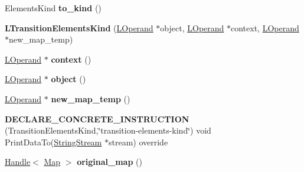 \begin{DoxyCompactItemize}
\item 
Elements\+Kind {\bfseries to\+\_\+kind} ()\hypertarget{classv8_1_1internal_1_1_l_transition_elements_kind_a131f478caf0a117639ee35cd0bdeed59}{}\label{classv8_1_1internal_1_1_l_transition_elements_kind_a131f478caf0a117639ee35cd0bdeed59}

\item 
{\bfseries L\+Transition\+Elements\+Kind} (\hyperlink{classv8_1_1internal_1_1_l_operand}{L\+Operand} $\ast$object, \hyperlink{classv8_1_1internal_1_1_l_operand}{L\+Operand} $\ast$context, \hyperlink{classv8_1_1internal_1_1_l_operand}{L\+Operand} $\ast$new\+\_\+map\+\_\+temp)\hypertarget{classv8_1_1internal_1_1_l_transition_elements_kind_a6a44fc06b9c2f761c817997ec00269f3}{}\label{classv8_1_1internal_1_1_l_transition_elements_kind_a6a44fc06b9c2f761c817997ec00269f3}

\item 
\hyperlink{classv8_1_1internal_1_1_l_operand}{L\+Operand} $\ast$ {\bfseries context} ()\hypertarget{classv8_1_1internal_1_1_l_transition_elements_kind_aad280c0f1cf8e5ca120cf21b05bd93f0}{}\label{classv8_1_1internal_1_1_l_transition_elements_kind_aad280c0f1cf8e5ca120cf21b05bd93f0}

\item 
\hyperlink{classv8_1_1internal_1_1_l_operand}{L\+Operand} $\ast$ {\bfseries object} ()\hypertarget{classv8_1_1internal_1_1_l_transition_elements_kind_a0257a511e1579fbc39001caf5b0ca855}{}\label{classv8_1_1internal_1_1_l_transition_elements_kind_a0257a511e1579fbc39001caf5b0ca855}

\item 
\hyperlink{classv8_1_1internal_1_1_l_operand}{L\+Operand} $\ast$ {\bfseries new\+\_\+map\+\_\+temp} ()\hypertarget{classv8_1_1internal_1_1_l_transition_elements_kind_a4a446ffbd6e39017d357109db06dd661}{}\label{classv8_1_1internal_1_1_l_transition_elements_kind_a4a446ffbd6e39017d357109db06dd661}

\item 
{\bfseries D\+E\+C\+L\+A\+R\+E\+\_\+\+C\+O\+N\+C\+R\+E\+T\+E\+\_\+\+I\+N\+S\+T\+R\+U\+C\+T\+I\+ON} (Transition\+Elements\+Kind,\char`\"{}transition-\/elements-\/kind\char`\"{}) void Print\+Data\+To(\hyperlink{classv8_1_1internal_1_1_string_stream}{String\+Stream} $\ast$stream) override\hypertarget{classv8_1_1internal_1_1_l_transition_elements_kind_ac3d3fcdb1323fb5a8ffe1c35ad9d633e}{}\label{classv8_1_1internal_1_1_l_transition_elements_kind_ac3d3fcdb1323fb5a8ffe1c35ad9d633e}

\item 
\hyperlink{classv8_1_1internal_1_1_handle}{Handle}$<$ \hyperlink{classv8_1_1internal_1_1_map}{Map} $>$ {\bfseries original\+\_\+map} ()\hypertarget{classv8_1_1internal_1_1_l_transition_elements_kind_a1f6534ac0fae8a2a00aacbdb977df2e1}{}\label{classv8_1_1internal_1_1_l_transition_elements_kind_a1f6534ac0fae8a2a00aacbdb977df2e1}


\end{DoxyCompactItemize}
